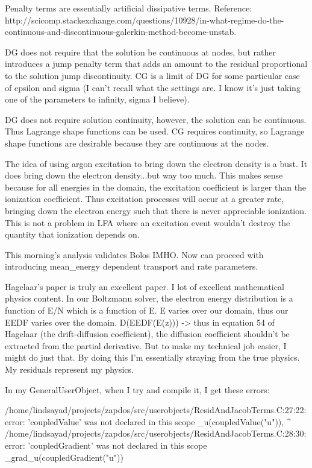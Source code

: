 {Penalty terms are essentially artificial dissipative terms. Reference: http://scicomp.stackexchange.com/questions/10928/in-what-regime-do-the-continuous-and-discontinuous-galerkin-method-become-unstab.

DG does not require that the solution be continuous at nodes, but rather introduces a jump penalty term that adds an amount to the residual proportional to the solution jump discontinuity. CG is a limit of DG for some particular case of epsilon and sigma (I can't recall what the settings are. I know it's just taking one of the parameters to infinity, sigma I believe).

DG does not require solution continuity, however, the solution can be continuous. Thus Lagrange shape functions can be used. CG requires continuity, so Lagrange shape functions are desirable because they are continuous at the nodes.

The idea of using argon excitation to bring down the electron density is a bust. It does bring down the electron density...but way too much. This makes sense because for all energies in the domain, the excitation coefficient is larger than the ionization coefficient. Thus excitation processes will occur at a greater rate, bringing down the electron energy such that there is never appreciable ionization. This is not a problem in LFA where an excitation event wouldn't destroy the quantity that ionization depends on.

This morning's analysis validates Bolos IMHO. Now can proceed with introducing mean_energy dependent transport and rate parameters.

Hagelaar's paper is truly an excellent paper. I lot of excellent mathematical physics content. In our Boltzmann solver, the electron energy distribution is a function of E/N which is a function of E. E varies over our domain, thus our EEDF varies over the domain. D(EEDF(E(z))) -> thus in equation 54 of Hagelaar (the drift-diffusion coefficient), the diffusion coefficient shouldn't be extracted from the partial derivative. But to make my technical job easier, I might do just that. By doing this I'm essentially straying from the true physics. My residuals represent my physics.

In my GeneralUserObject, when I try and compile it, I get these errors:

/home/lindsayad/projects/zapdos/src/userobjects/ResidAndJacobTerms.C:27:22: error: 'coupledValue' was not declared in this scope
   _u(coupledValue("u")),
                      ^
/home/lindsayad/projects/zapdos/src/userobjects/ResidAndJacobTerms.C:28:30: error: 'coupledGradient' was not declared in this scope
   _grad_u(coupledGradient("u"))

}
